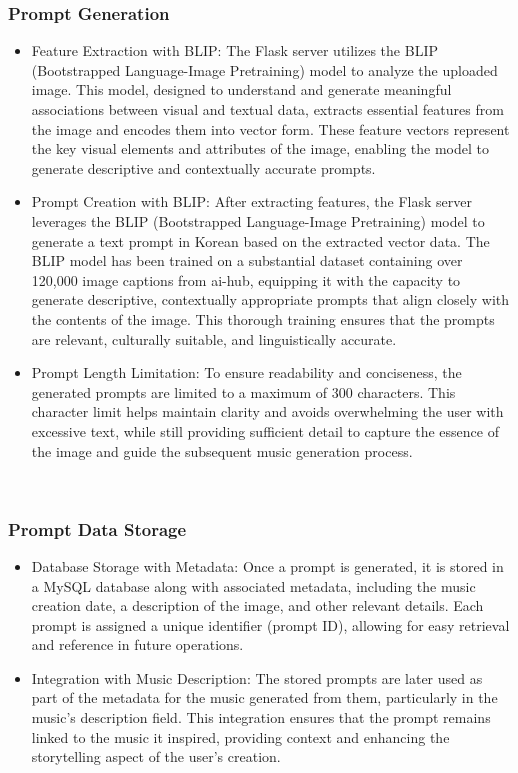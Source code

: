 \documentclass[conference]{IEEEtran}
\begin{document}
\subsubsection{Prompt Generation}
\begin{itemize}
    \item Feature Extraction with BLIP: The Flask server utilizes the BLIP (Bootstrapped Language-Image Pretraining) model to analyze the uploaded image. This model, designed to understand and generate meaningful associations between visual and textual data, extracts essential features from the image and encodes them into vector form. These feature vectors represent the key visual elements and attributes of the image, enabling the model to generate descriptive and contextually accurate prompts.\\
    \item Prompt Creation with BLIP: After extracting features, the Flask server leverages the BLIP (Bootstrapped Language-Image Pretraining) model to generate a text prompt in Korean based on the extracted vector data. The BLIP model has been trained on a substantial dataset containing over 120,000 image captions from ai-hub, equipping it with the capacity to generate descriptive, contextually appropriate prompts that align closely with the contents of the image. This thorough training ensures that the prompts are relevant, culturally suitable, and linguistically accurate.\\
    \item Prompt Length Limitation: To ensure readability and conciseness, the generated prompts are limited to a maximum of 300 characters. This character limit helps maintain clarity and avoids overwhelming the user with excessive text, while still providing sufficient detail to capture the essence of the image and guide the subsequent music generation process.\\
\end{itemize}
\

\subsubsection{Prompt Data Storage}
\begin{itemize}
    \item Database Storage with Metadata: Once a prompt is generated, it is stored in a MySQL database along with associated metadata, including the music creation date, a description of the image, and other relevant details. Each prompt is assigned a unique identifier (prompt ID), allowing for easy retrieval and reference in future operations.\\
    \item Integration with Music Description: The stored prompts are later used as part of the metadata for the music generated from them, particularly in the music’s description field. This integration ensures that the prompt remains linked to the music it inspired, providing context and enhancing the storytelling aspect of the user’s creation.\\
\end{itemize}
\end{document}

